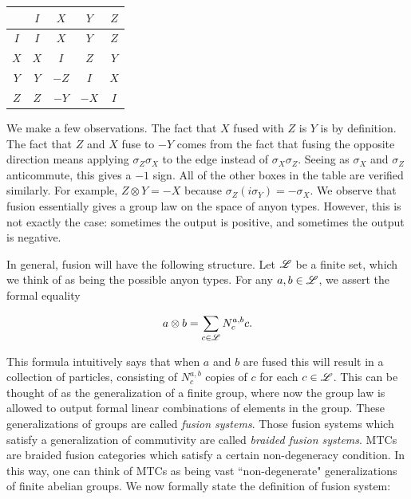 \documentclass{article}
\theoremstyle{definition}
\numberwithin{figure}{section}
\begin{document}
\begin{center}
\begin{tabular}{c |c |c |c |c} 
 & $I$ & $X$ & $Y$ & $Z$ \\ [0.5ex] 
 \hline
 $I$ & $I$ & $X$ & $Y$ & $Z$ \\ 
 \hline
 $X$ & $X$ & $I$ & $Z$ & $Y$ \\
 \hline
 $Y$ & $Y$ & $-Z$ & $I$ & $X$ \\
 \hline
 $Z$ & $Z$ & $-Y$ & $-X$ & $I$
\end{tabular}
\end{center}

We make a few observations. The fact that $X$ fused with $Z$ is $Y$ is by definition. The fact that $Z$ and $X$ fuse to $-Y$ comes from the fact that fusing the opposite direction means applying $\sigma_Z\sigma_X$ to the edge instead of $\sigma_X\sigma_Z$. Seeing as $\sigma_X$ and $\sigma_Z$ anticommute, this gives a $-1$ sign. All of the other boxes in the table are verified similarly. For example, $Z\otimes Y=-X$ because $\sigma_Z(i\sigma_Y)=-\sigma_X$. We observe that fusion essentially gives a group law on the space of anyon types. However, this is not exactly the case: sometimes the output is positive, and sometimes the output is negative.

In general, fusion will have the following structure. Let $\mathscr{L}$ be a finite set, which we think of as being the possible anyon types. For any $a,b\in \mathscr{L}$, we assert the formal equality

$$a\otimes b=\sum_{c\in \mathscr{L}}N_{c}^{a,b}c.$$

This formula intuitively says that when $a$ and $b$ are fused this will result in a collection of particles, consisting of $N_c^{a,b}$ copies of $c$ for each $c\in \mathscr{L}$. This can be thought of as the generalization of a finite group, where now the group law is allowed to output formal linear combinations of elements in the group. These generalizations of groups are called \textit{fusion systems}. Those fusion systems which satisfy a generalization of commutivity are called \textit{braided fusion systems}. MTCs are braided fusion categories which satisfy a certain non-degeneracy condition. In this way, one can think of MTCs as being vast ``non-degenerate" generalizations of finite abelian groups. We now formally state the definition of fusion system:
\end{document}
